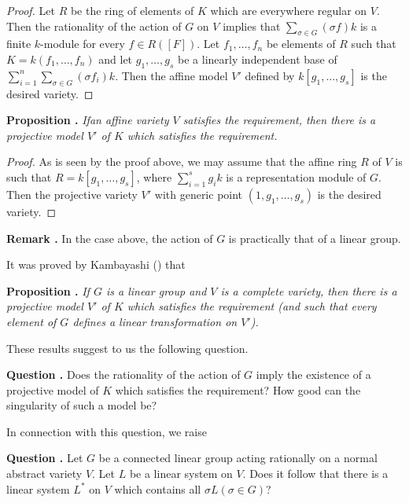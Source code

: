 \begin{proof}
Let $R$ be the ring of elements of $K$ which are everywhere regular on $V$. Then the rationality of the action of $G$ on $V$ implies that $\sum\limits_{\sigma \in G}(\sigma f)k$ is a finite $k$-module for every $f\in R([F])$. Let $f_{1},\ldots,f_{n}$ be elements of $R$ such that $K=k(f_{1},\ldots,f_{n})$ and let $g_{1},\ldots,g_{s}$ be a linearly independent base of $\sum\limits^{n}_{i=1}\sum\limits_{\sigma \in G}(\sigma f_{i})k$. Then the affine model $V'$ defined by $k[g_{1},\ldots,g_{s}]$ is the desired variety.
\end{proof}

\eject

\noindent
{\bf Proposition .\label{art16-prop1.3}}
{\em If\pageoriginale an affine variety $V$ satisfies the requirement, then there is a projective model $V'$ of $K$ which satisfies the requirement.}

\begin{proof}
As is seen by the proof above, we may assume that the affine ring $R$ of $V$ is such that $R=k[g_{1},\ldots,g_{s}]$, where $\sum\limits^{s}_{i=1}g_{i}k$ is a representation module of $G$. Then the projective variety $V'$ with generic point $(1,g_{1},\ldots,g_{s})$ is the desired variety.
\end{proof}

\medskip
\noindent
{\bf Remark .\label{art16-rem1.4}}
In the case above, the action of $G$ is practically that of a linear group.
\smallskip

It was proved by Kambayashi (\cite{art16-key-K}) that

\medskip
\noindent
{\bf Proposition .\label{art16-prop1.5}}
{\em If $G$ is a linear group and $V$ is a complete variety, then there is a projective model $V'$ of $K$ which satisfies the requirement (and such that every element of $G$ defines a linear transformation on $V'$).}
\smallskip

These results suggest to us the following question.

\medskip
\noindent
{\bf Question .\label{art16-ques1.6}}
Does the rationality of the action of $G$ imply the existence of a projective model of $K$ which satisfies the requirement? How good can the singularity of such a model be?
\smallskip

In connection with this question, we raise

\medskip
\noindent
{\bf Question .\label{art16-ques1.7}}
Let $G$ be a connected linear group acting rationally on a normal abstract variety $V$. Let $L$ be a linear system on $V$. Does it follow that there is a linear system $L^{*}$ on $V$ which contains all $\sigma L(\sigma\in G)$?
\smallskip

